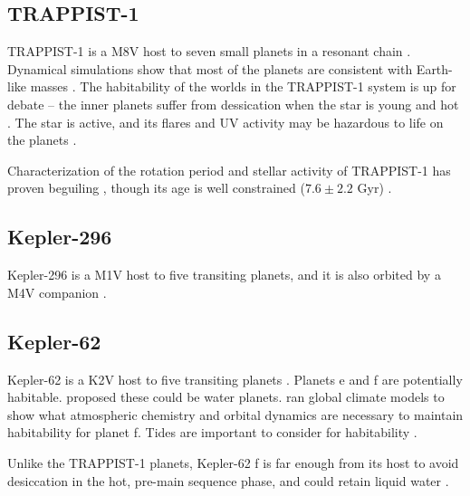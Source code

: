 \subsection{TRAPPIST-1}

TRAPPIST-1 is a M8V host to seven small planets in a resonant chain \citep{Gillon2016, Gillon2017, Luger2017, Delrez2018}. Dynamical simulations show that most of the planets are consistent with Earth-like masses \citep{Quarles2017}. The habitability of the worlds in the TRAPPIST-1 system is up for debate -- the inner planets suffer from dessication when the star is young and hot \citep{Luger2015, Bolmont2017}. The star is active, and its flares and UV activity may be hazardous to life on the planets \citep{Vida2017, Davenport2017, Roettenbacher2017}. 

Characterization of the rotation period and stellar activity of TRAPPIST-1 has proven beguiling \citep{Roettenbacher2017, Morris2018c, Rackham2018, Zhang2018}, though its age is well constrained ($7.6 \pm 2.2$ Gyr) \citep{Burgasser2017}. 


\subsection{Kepler-296}

Kepler-296 is a M1V host to five transiting planets, and it is also orbited by a M4V companion \citep{Lissauer2014, Torres2015, Barclay2015}. 

\subsection{Kepler-62}

Kepler-62 is a K2V host to five transiting planets \citep{Borucki2013}. Planets e and f are potentially habitable. \citet{Kaltenegger2013} proposed these could be water planets. \citet{Shields2016} ran global climate models to show what atmospheric chemistry and orbital dynamics are necessary to maintain habitability for planet f. Tides are important to consider for habitability \citep{Bolmont2014, Bolmont2015}.

Unlike the TRAPPIST-1 planets, Kepler-62 f is far enough from its host to avoid desiccation in the hot, pre-main sequence phase, and could retain liquid water \citep{Luger2015}. 


